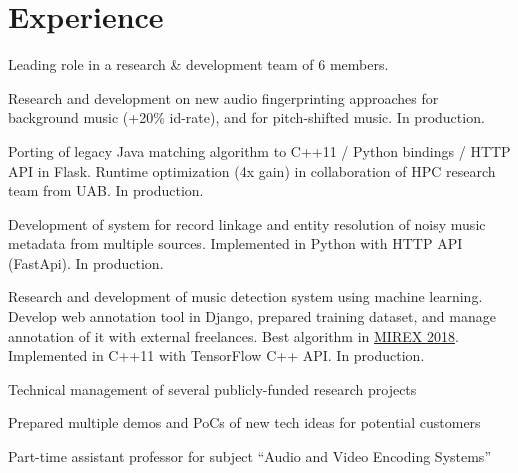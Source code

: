 \documentclass[]{deedy-resume-openfont}
\begin{document}
\begin{minipage}[t]{0.66\textwidth} 


\section{Experience}
\vspace{\topsep} %
\begin{tightemize}
\item Leading role in a research \& development team of 6 members.
\item Research and development on new audio fingerprinting approaches for background music (+20\% id-rate), and for pitch-shifted music. In production.
\item Porting of legacy Java matching algorithm to C++11 / Python bindings / HTTP API in Flask. Runtime optimization (4x gain) in collaboration of HPC research team from UAB. In production.
\item Development of system for record linkage and entity resolution of noisy music metadata from multiple sources. Implemented in Python with HTTP API (FastApi). In production.
\item Research and development of music detection system using machine learning. Develop web annotation tool in Django, prepared training dataset, and manage annotation of it with external freelances. Best algorithm in \href{https://www.music-ir.org/mirex/wiki/2018:Music_and_or_Speech_Detection_Results}{MIREX 2018}. Implemented in C++11 with TensorFlow C++ API. In production.
\item Technical management of several publicly-funded research projects
\item Prepared multiple demos and PoCs of new tech ideas for potential customers
\end{tightemize}
\sectionsep

\begin{tightemize}
\item Part-time assistant professor for subject ``Audio and Video Encoding Systems''
\end{tightemize}
\sectionsep


\end{minipage}
\end{document}
